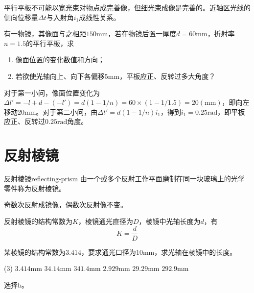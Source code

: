 \documentclass[cn,10pt,chinesefont=founder,math=newtx,cite=super,twoside]{elegantbook}
\begin{document}
\begin{note}
	平行平板不可能以宽光束对物点成完善像，但细光束成像是完善的。近轴区光线的侧向位移量$\Delta t$与入射角$i_1$成线性关系。
\end{note}

\begin{problem}
	有一物镜，其像面与之相距$150\mathrm{mm}$，若在物镜后置一厚度$d=60\mathrm{mm}$，折射率$n=1.5$的平行平板，求
	\begin{enumerate}
		\item 像面位置的变化数值和方向；
		\item 若欲使光轴向上、向下各偏移$5\mathrm{mm}$，平板应正、反转过多大角度？
	\end{enumerate}
\end{problem}
\begin{solution}
	对于第一小问，像面位置变化为$\Delta l'=-l+d-(-l')=d(1-1/n)=60\times(1-1/1.5)=20(\mathrm{mm})$，即向左移动$20\mathrm{mm}$。对于第二小问，由$\Delta t'=d(1-1/n)i_1$，得到$i_1=0.25\mathrm{rad}$，即平板应正、反转过$0.25\mathrm{rad}$角度。
\end{solution}


\section{反射棱镜}
\label{sect:reflecting-prism}

\begin{definition}{反射棱镜}{reflecting-prism}
	由一个或多个反射工作平面磨制在同一块玻璃上的光学零件称为反射棱镜。
\end{definition}

\begin{property}
	奇数次反射成镜像，偶数次反射像不变。
\end{property}

反射棱镜的结构常数为$K$，棱镜通光直径为$D$，棱镜中光轴长度为$d$，有
\begin{equation}
K=\frac{d}{D}
\end{equation}

\begin{problem}
	某棱镜的结构常数为$3.414$，要求通光口径为$10\mathrm{mm}$，求光轴在棱镜中的长度。
	\begin{tasks}(3)
		\task $3.414\mathrm{mm}$
		\task $34.14\mathrm{mm}$
		\task $341.4\mathrm{mm}$
		\task $2.929\mathrm{mm}$
		\task $29.29\mathrm{mm}$
		\task $292.9\mathrm{mm}$
	\end{tasks}
\end{problem}
\begin{solution}
	选择b。
\end{solution}
\end{document}
